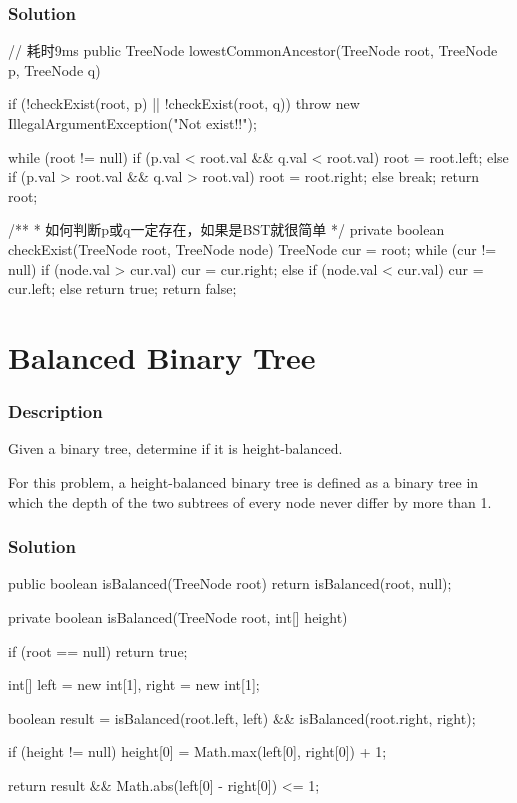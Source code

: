 \subsubsection{Solution}

\begin{Code}
// 耗时9ms
public TreeNode lowestCommonAncestor(TreeNode root, TreeNode p, TreeNode q) {
    if (!checkExist(root, p) || !checkExist(root, q)) {
        throw new IllegalArgumentException("Not exist!!");
    }

    while (root != null) {
        if (p.val < root.val && q.val < root.val) {
            root = root.left;
        } else if (p.val > root.val && q.val > root.val) {
            root = root.right;
        } else {
            break;
        }
    }
    return root;
}

/**
 * 如何判断p或q一定存在，如果是BST就很简单
 */
private boolean checkExist(TreeNode root, TreeNode node) {
    TreeNode cur = root;
    while (cur != null) {
        if (node.val > cur.val) {
            cur = cur.right;
        } else if (node.val < cur.val) {
            cur = cur.left;
        } else {
            return true;
        }
    }
    return false;
}
\end{Code}

\newpage

\section{Balanced Binary Tree} %

\subsubsection{Description}

Given a binary tree, determine if it is height-balanced.

For this problem, a height-balanced binary tree is defined as a binary tree in which the depth of the two subtrees of every node never differ by more than 1.

\subsubsection{Solution}

\begin{Code}
public boolean isBalanced(TreeNode root) {
    return isBalanced(root, null);
}

private boolean isBalanced(TreeNode root, int[] height) {
    if (root == null) {
        return true;
    }

    int[] left = new int[1], right = new int[1];

    boolean result = isBalanced(root.left, left) && isBalanced(root.right, right);

    if (height != null) {
        height[0] = Math.max(left[0], right[0]) + 1;
    }

    return result && Math.abs(left[0] - right[0]) <= 1;
}
\end{Code}

